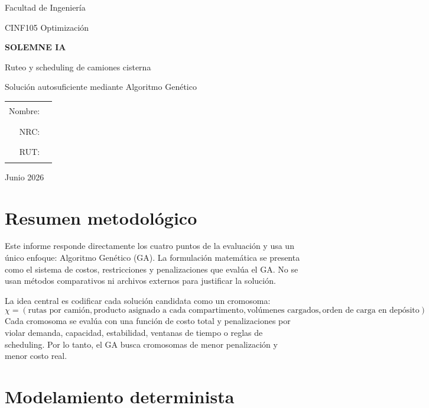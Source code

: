 \documentclass[11pt,letterpaper]{article}
\begin{document}
\begin{titlepage}
    \centering
    \vspace*{1.2cm}
    {\Large Facultad de Ingeniería \par}
    \vspace{0.4cm}
    {\large CINF105 Optimización \par}
    \vspace{2.0cm}
    {\Huge\bfseries SOLEMNE IA \par}
    \vspace{0.4cm}
    {\LARGE Ruteo y scheduling de camiones cisterna \par}
    \vspace{0.4cm}
    {\Large Solución autosuficiente mediante Algoritmo Genético \par}
    \vfill
    \begin{tabular}{rl}
        Nombre: & \rule{8cm}{0.4pt} \\
        NRC: & \rule{8cm}{0.4pt} \\
        RUT: & \rule{8cm}{0.4pt}
    \end{tabular}
    \vfill
    {\large Junio 2026 \par}
\end{titlepage}

\tableofcontents
\newpage

\section*{Resumen metodológico}

Este informe responde directamente los cuatro puntos de la evaluación y usa un único enfoque:
Algoritmo Genético (GA). La formulación matemática se presenta como el sistema de costos,
restricciones y penalizaciones que evalúa el GA. No se usan métodos comparativos ni archivos
externos para justificar la solución.

La idea central es codificar cada solución candidata como un cromosoma:
\[
\chi =
\left(
    \text{rutas por camión},
    \text{producto asignado a cada compartimento},
    \text{volúmenes cargados},
    \text{orden de carga en depósito}
\right).
\]
Cada cromosoma se evalúa con una función de costo total y penalizaciones por violar demanda,
capacidad, estabilidad, ventanas de tiempo o reglas de scheduling. Por lo tanto, el GA busca
cromosomas de menor penalización y menor costo real.

\section{Modelamiento determinista}
\end{document}
